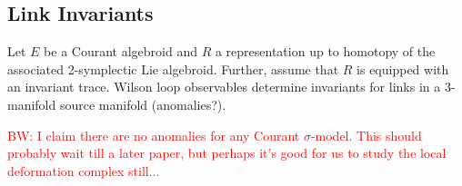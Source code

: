 \documentclass{amsart}
\def\brian{\textcolor{red}{BW: }\textcolor{red}}
\begin{document}
\subsection{Link Invariants}

Let $E$ be a Courant algebroid and $R$ a representation up to homotopy of the associated 2-symplectic Lie algebroid.  Further, assume that $R$ is equipped with an invariant trace.  Wilson loop observables determine invariants for links in a 3-manifold source manifold (anomalies?).

\brian{I claim there are no anomalies for any Courant $\sigma$-model. This should probably wait till a later paper, but perhaps it's good for us to study the local deformation complex still...} 
\end{document}
